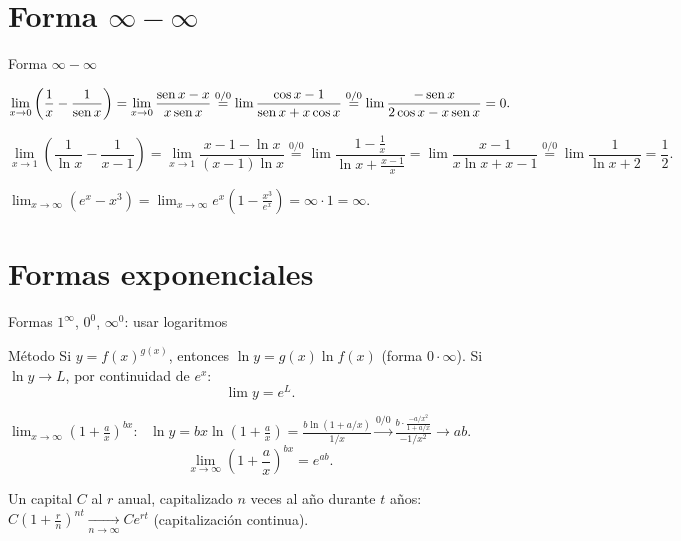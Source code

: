 \documentclass[10pt,aspectratio=169]{beamer}
\begin{document}
\section{Forma $\infty-\infty$}

\begin{frame}{Forma $\infty-\infty$}
  \begin{ejemplo}
    \[ \lim_{x\to0}\left(\frac1x-\frac1{\operatorname{sen} x}\right)=\lim_{x\to0}\frac{\operatorname{sen} x-x}{x\operatorname{sen} x}\overset{0/0}{=}\lim\frac{\cos x-1}{\operatorname{sen} x+x\cos x}\overset{0/0}{=}\lim\frac{-\operatorname{sen} x}{2\cos x-x\operatorname{sen} x}=0. \]
  \end{ejemplo}
  \begin{ejemplo}[7]
    \[ \lim_{x\to1}\left(\frac{1}{\ln x}-\frac{1}{x-1}\right)=\lim_{x\to1}\frac{x-1-\ln x}{(x-1)\ln x}\overset{0/0}{=}\lim\frac{1-\frac1x}{\ln x+\frac{x-1}{x}}=\lim\frac{x-1}{x\ln x+x-1}\overset{0/0}{=}\lim\frac{1}{\ln x+2}=\frac12. \]
  \end{ejemplo}
  \begin{ejemplo}[8: factorizar]
    $\displaystyle\lim_{x\to\infty}\left(e^x-x^3\right)=\lim_{x\to\infty}e^x\left(1-\frac{x^3}{e^x}\right)=\infty\cdot1=\infty$.
  \end{ejemplo}
\end{frame}

\section{Formas exponenciales}

\begin{frame}{Formas $1^\infty$, $0^0$, $\infty^0$: usar logaritmos}
  \begin{block}{Método}
    Si $y=f(x)^{g(x)}$, entonces $\ln y=g(x)\ln f(x)$ (forma $0\cdot\infty$). Si $\ln y\to L$, por continuidad de $e^x$:
    \[ \lim y=e^{L}. \]
  \end{block}
  \begin{ejemplo}[9: el número $e$]
    $\displaystyle\lim_{x\to\infty}\left(1+\frac ax\right)^{bx}$: \ $\ln y=bx\ln\left(1+\frac ax\right)=\frac{b\ln(1+a/x)}{1/x}\overset{0/0}{\to}\frac{b\cdot\frac{-a/x^2}{1+a/x}}{-1/x^2}\to ab$.
    \[ \lim_{x\to\infty}\left(1+\frac ax\right)^{bx}=e^{ab}. \]
  \end{ejemplo}
  \begin{ejemplo}
    Un capital $C$ al $r$ anual, capitalizado $n$ veces al año durante $t$ años: $C\left(1+\frac rn\right)^{nt}\xrightarrow[n\to\infty]{}Ce^{rt}$
    (capitalización continua).
  \end{ejemplo}
\end{frame}
\end{document}
